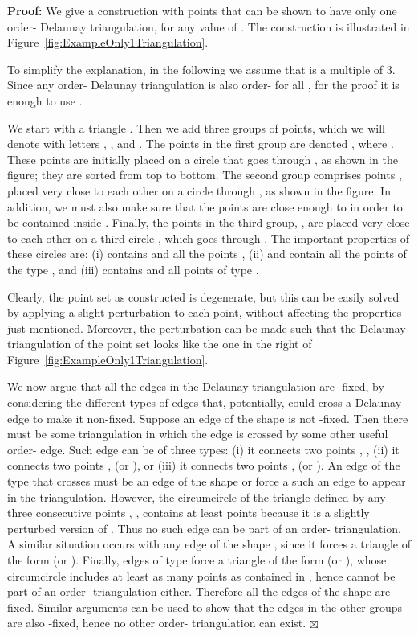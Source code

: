 \documentclass {journal}
\newenvironment {proof}{\textbf {Proof:}}{\hfill \ensuremath {\boxtimes}}
\begin{document}
\begin{proof}
We give a construction with  points that can be shown to have only one order- Delaunay triangulation, for any value of  . The construction is illustrated in Figure~\ref{fig:ExampleOnly1Triangulation}.

To simplify the explanation, in the following we assume that  is a multiple of 3.
Since any order- Delaunay triangulation is also order- for all , for the proof it is enough to use .


We start with a triangle . Then we add
three groups of points, which we will denote with letters ,
, and . The points in the first group are
denoted , where . These points are initially
placed on a circle  that goes through , as shown in the
figure; they are sorted from top to bottom. The second group
comprises  points , placed very close to each
other on a circle  through , as shown in the figure. In
addition, we must also make sure that the points 
are close enough to  in order to be contained inside
. Finally, the points in the third group, , are placed very close to each other on a third
circle , which goes through . The important properties
of these circles are:
(i)  contains  and all the points ,
(ii)  and  contain all the points of the type ,
and
(iii)  contains  and all points of type .

Clearly, the point set as constructed is degenerate, but this can be easily solved by applying a slight perturbation to each point, without affecting the properties just mentioned.
Moreover, the perturbation can be made such that the Delaunay triangulation of the point set looks like the one in the right of Figure~\ref{fig:ExampleOnly1Triangulation}.

We now argue that all the edges in the Delaunay triangulation are
-fixed, by considering the different types of edges that,
potentially, could cross a Delaunay edge to make it non-fixed.
Suppose an edge of the shape  is not
-fixed. Then there must be some triangulation in which the edge
is crossed by some other useful order- edge. Such edge can be
of three types: (i) it connects two points , , (ii) it
connects two points ,  (or ), or (iii) it connects
two points ,  (or ). An edge of the type
 that crosses  must be an
edge of the shape  or force a such an edge
to appear in the triangulation. However, the circumcircle of the
triangle defined by any three consecutive points , ,
 contains at least  points because it is a slightly
perturbed version of . Thus no such edge can be part of an
order- triangulation. A similar situation occurs with any edge
of the shape , since it forces a triangle of
the form  (or ).
Finally, edges of type  force a triangle of
the form  (or ), whose
circumcircle includes at least as many points as contained in
, hence cannot be part of an order-
triangulation either. Therefore all the edges of the shape
 are -fixed. Similar arguments can be used
to show that the edges in the other groups are also -fixed,
hence no other order- triangulation can exist.
\end{proof}
\end{document}
